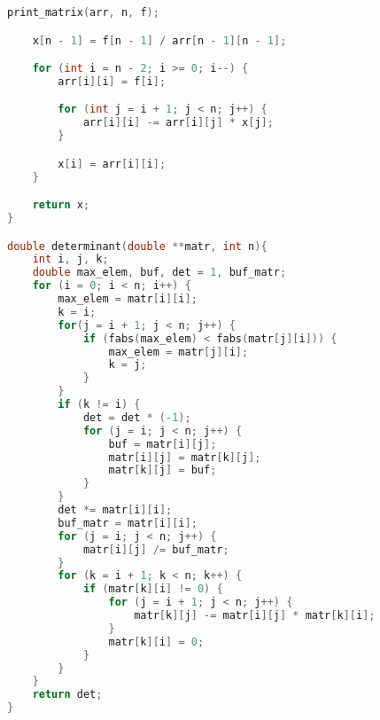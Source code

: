 \documentclass[a4paper,12pt,titlepage,finall]{article}
\begin{document}
\begin{lstlisting}[language=C, caption=main.c]
    print_matrix(arr, n, f);

    x[n - 1] = f[n - 1] / arr[n - 1][n - 1];

    for (int i = n - 2; i >= 0; i--) {
        arr[i][i] = f[i];

        for (int j = i + 1; j < n; j++) {
            arr[i][i] -= arr[i][j] * x[j]; 
        }

        x[i] = arr[i][i];
    }

    return x;
}

double determinant(double **matr, int n){
    int i, j, k;
    double max_elem, buf, det = 1, buf_matr;
    for (i = 0; i < n; i++) {
        max_elem = matr[i][i];
        k = i;
        for(j = i + 1; j < n; j++) {
            if (fabs(max_elem) < fabs(matr[j][i])) {
                max_elem = matr[j][i];
                k = j;
            }
        }
        if (k != i) {
            det = det * (-1);
            for (j = i; j < n; j++) {
                buf = matr[i][j];
                matr[i][j] = matr[k][j];
                matr[k][j] = buf;
            }
        }
        det *= matr[i][i];
        buf_matr = matr[i][i];
        for (j = i; j < n; j++) {
            matr[i][j] /= buf_matr;
        }
        for (k = i + 1; k < n; k++) {
            if (matr[k][i] != 0) {
                for (j = i + 1; j < n; j++) {
                    matr[k][j] -= matr[i][j] * matr[k][i];
                }
                matr[k][i] = 0;
            }
        }
    }
    return det;
}


\end{lstlisting}
\end{document}
